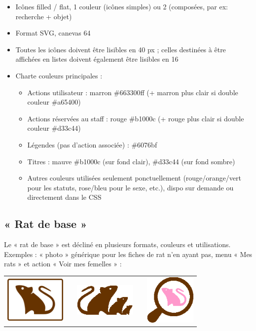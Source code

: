 \documentclass[a4paper,10pt]{article}
\begin{document}
\begin{itemize}
\item Icônes filled / flat, 1 couleur (icônes simples) ou 2 (composées, par ex: recherche + objet) 
\item Format SVG, canevas 64 
\item Toutes les icônes doivent être lisibles en 40  px ; celles destinées à être affichées en listes doivent également être lisibles en 16 
\item Charte couleurs principales : 
	\begin{itemize}
	 \item Actions utilisateur : marron \#663300ff  (+ marron plus clair si double couleur \#a65400)
	 \item Actions réservées au staff : rouge \#b1000c (+ rouge plus clair si double couleur \#d33c44)
	 \item Légendes (pas d'action associée) : \#6076bf
	 \item Titres : mauve \#b1000c (sur fond clair), \#d33c44 (sur fond sombre)
	 \item Autres couleurs utilisées seulement ponctuellement (rouge/orange/vert pour les statuts, rose/bleu pour le sexe, etc.), dispo sur demande ou directement dans le CSS
	\end{itemize}
\end{itemize}

\subsection{« Rat de base » }
Le « rat de base » est décliné en plusieurs formats, couleurs et utilisations. Exemples : « photo » générique pour les fiches de rat n'en ayant pas, menu « Mes rats » et action « Voir mes femelles » :       
\begin{center}
\begin{tabularx}{12cm}{m{3cm}m{0.5cm}m{3cm}m{0.5cm}m{2.5cm}}
\includegraphics[width=3cm]{icon-unknown-rat.eps} & & \includegraphics[width=3cm]{icon-three-rats.eps} & & \includegraphics[width=2.5cm]{icon-search-females.eps}
\end{tabularx}
\end{center}
\end{document}
